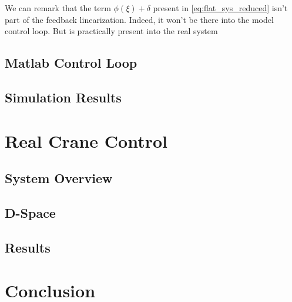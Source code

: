 We can remark that the term \( \phi(\xi) + \delta\) present in \ref{eq:flat_sys_reduced} isn't part of the feedback linearization. Indeed, it won't be there into the model control loop. But is practically present into the real system 

\subsection{Matlab Control Loop}


\subsection{Simulation Results}


\section{Real Crane Control}


\subsection{System Overview}


\subsection{D-Space}


\subsection{Results}


\section{Conclusion}








